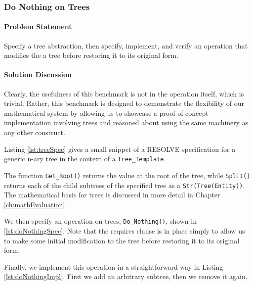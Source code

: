 \FloatBarrier
		\subsubsection{Do Nothing on Trees}	
\paragraph{Problem Statement}Specify a tree abstraction, then specify, implement, and verify an operation that modifies the a tree before restoring it to its original form.

\paragraph{Solution Discussion}Clearly, the usefulness of this benchmark is not in the operation itself, which is trivial.  Rather, this benchmark is designed to demonstrate the flexibility of our mathematical system by allowing us to showcase a proof-of-concept implementation involving trees and reasoned about using the same machinery as any other construct.

Listing \ref{lst:treeSpec} gives a small snippet of a RESOLVE specification for a generic n-ary tree in the context of a \texttt{Tree\_Template}.



The function \texttt{Get\_Root()} returns the value at the root of the tree, while \texttt{Split()} returns each of the child subtrees of the specified tree as a \texttt{Str(Tree(Entity))}.  The mathematical basis for trees is discussed in more detail in Chapter \ref{ch:mathEvaluation}.

We then specify an operation on trees, \texttt{Do\_Nothing()}, shown in \ref{lst:doNothingSpec}.  Note that the requires clause is in place simply to allow us to make some initial modification to the tree before restoring it to its original form.



Finally, we implement this operation in a straightforward way in Listing \ref{lst:doNothingImpl}.  First we add an arbitrary subtree, then we remove it again.


